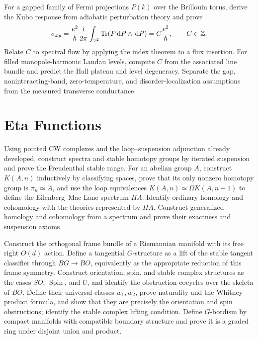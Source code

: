 \begin{exercise}
For a gapped family of Fermi projections $P(k)$ over the Brillouin torus,
derive the Kubo response from adiabatic perturbation theory and prove
\[
 \sigma_{xy}=\frac{e^2}{h}\frac{\mathrm i}{2\pi}
 \int_{\mathbb T^2}\operatorname{Tr}(P\,\mathrm d P\wedge\,\mathrm d P)
 =C\frac{e^2}{h},\qquad C\in\mathbb Z.
\]
Relate $C$ to spectral flow by applying the index theorem to a flux insertion.
For filled monopole-harmonic Landau levels, compute $C$ from the associated
line bundle and predict the Hall plateau and level degeneracy.  Separate the
gap, noninteracting-band, zero-temperature, and disorder-localization
assumptions from the measured transverse conductance.
\end{exercise}

\section{Eta Functions}

\begin{exercise}
Using pointed CW complexes and the loop--suspension adjunction already
developed, construct spectra and stable homotopy groups by iterated
suspension and prove the Freudenthal stable range.  For an abelian group $A$,
construct $K(A,n)$ inductively by classifying spaces, prove that its only
nonzero homotopy group is $\pi_n\simeq A$, and use the loop equivalences
$K(A,n)\simeq\Omega K(A,n+1)$ to define the Eilenberg--Mac Lane spectrum
$HA$.  Identify ordinary homology and cohomology with the theories represented
by $HA$.  Construct generalized
homology and cohomology from a spectrum and prove their exactness and
suspension axioms.
\end{exercise}

\begin{exercise}
Construct the orthogonal frame bundle of a Riemannian manifold with its free
right $O(d)$ action.  Define a tangential $G$-structure as a lift of the
stable tangent classifier through $BG\to BO$, equivalently as the appropriate
reduction of this frame symmetry.  Construct orientation, spin, and stable
complex
structures as the cases $SO$, $\operatorname{Spin}$, and $U$, and identify
the obstruction cocycles over the skeleta of $BO$.  Define their universal
classes $w_1,w_2$, prove naturality and the Whitney product formula, and show
that they are precisely the orientation and spin obstructions; identify the
stable complex lifting condition.
Define $G$-bordism by compact manifolds with compatible boundary structure
and prove it is a graded ring under disjoint union and product.
\end{exercise}

